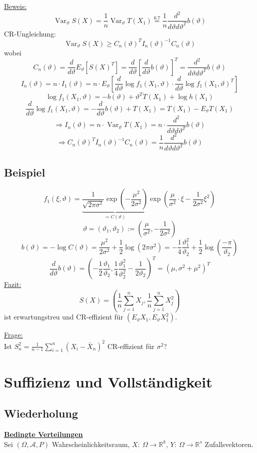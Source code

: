 \documentclass[a4paper,11pt,twoside,titlepage]{article}
\newcommand{\R}{{\mathbb R}}
\newcommand\AAA{ \mathcal{A} } %
\DeclareMathOperator{\var}{Var}
\begin{document}
\underline{Beweis:}
\[\var_\vartheta S(X)=\frac1n\var_\vartheta T(X_1)\stackrel{6.7}{=}\frac1n\frac{d^2}{d\vartheta d\vartheta^T}b(\vartheta)\]
CR-Ungleichung:
\[\var_\vartheta S(X)\geq C_n(\vartheta)^T I_n(\vartheta)^{-1} C_n(\vartheta)\]
wobei
\[C_n(\vartheta)=\frac{d}{d\vartheta}E_\vartheta[S(X)^T]=\frac{d}{d\vartheta}[\frac{d}{d\vartheta}b(\vartheta)]^T=\frac{d^2}{d\vartheta d\vartheta^T}b(\vartheta)\] 
\[I_n(\vartheta)=n\cdot I_1(\vartheta)=n\cdot E_\vartheta[\frac{d}{d\vartheta}\log f_1(X_1,\vartheta)\cdot \frac{d}{d\vartheta}\log f_1(X_1,\vartheta)^T]\]
\[\log f_1(X_1,\vartheta)=-b(\vartheta)+\vartheta^T T(X_1)+\log h(X_1)\]
\[\frac{d}{d\vartheta}\log f_1(X_1,\vartheta)=-\frac{d}{d\vartheta}b(\vartheta)+T(X_1)=T(X_1)-E_\vartheta T(X_1)\]
\[\Rightarrow I_n(\vartheta)=n\cdot\var_\vartheta T(X_1)=n\cdot\frac{d^2}{d\vartheta d\vartheta^T}b(\vartheta)\]
\[\Rightarrow C_n(\vartheta)^T I_n(\vartheta)^{-1} C_n(\vartheta)=\frac1n\frac{d^2}{d\vartheta d\vartheta^T}b(\vartheta)\]

\subsection{Beispiel}
\[f_1(\xi,\vartheta)=\underbrace{\frac{1}{\sqrt{2\pi\sigma^2}}\exp(-\frac{\mu^2}{2\sigma^2})}_{=C(\vartheta)}\exp(\frac{\mu}{\sigma^2}\cdot\xi-\frac{1}{2\sigma^2}\xi^2)\]
\[\vartheta=(\vartheta_1,\vartheta_2):=(\frac{\mu}{\sigma^2},-\frac{1}{2\sigma^2})\]
\[b(\vartheta)=-\log C(\vartheta)=\frac{\mu^2}{2\sigma^2}+\frac12\log(2\pi\sigma^2)=-\frac14\frac{\vartheta_1^2}{\vartheta_2}+\frac12\log(\frac{-\pi}{\vartheta_2})\]
\[\frac{d}{d\vartheta}b(\vartheta)=(-\frac12\frac{\vartheta_1}{\vartheta_2},\frac14\frac{\vartheta_1^2}{\vartheta_2^2}-\frac{1}{2\vartheta_2})^T=(\mu,\sigma^2+\mu^2)^T\]
\underline{Fazit:}
\[S(X)=(\frac1n\sum_{j=1}^nX_j,\frac1n\sum_{j=1}^n X_j^2)\]
ist erwartungstreu und CR-effizient für $(E_\vartheta X_1,E_\vartheta X_1^2)$.

\underline{Frage:}\\
Ist $S_n^2=\frac{1}{n-1}\sum_{i=1}^n(X_i-\bar X_n)^2$ CR-effizient für $\sigma^2$?

\cleardoublepage
\section{Suffizienz und Vollständigkeit}
\subsection{Wiederholung}
\underline{\textbf{Bedingte Verteilungen}}\\
Sei $(\Omega,\AAA,P)$ Wahrscheinlichkeitsraum, $X:\ \Omega\to\R^k$, $Y:\ \Omega\to\R^s$ Zufallsvektoren.
\end{document}
